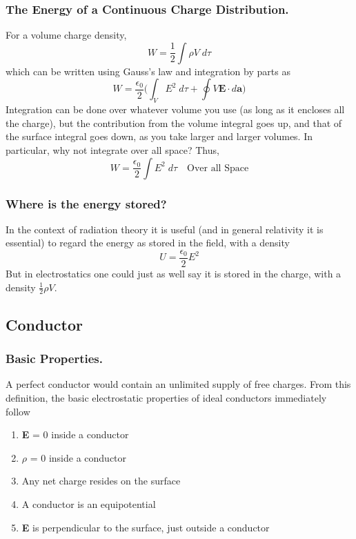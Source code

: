 \documentclass[../../../main.tex]{subfiles}
\begin{document}
\subsubsection*{The Energy of a Continuous Charge Distribution.} For a volume charge density,
\begin{equation*}
    W=\frac{1}{2}\int\rho V\;d\tau
\end{equation*}
which can be written using Gauss's law and integration by parts as
\begin{equation*}
    W=\frac{\epsilon_0}{2}\Biggl(\int_{V}E^2\;d\tau+ \oint V\mathbf{E}\cdot d\mathbf{a}\Biggr)
\end{equation*}
Integration can be done over whatever volume you use (as long as it encloses all the charge), but the contribution from the volume integral goes up, and that of the surface integral goes down, as you take larger and larger volumes. In particular, why not integrate over all space? Thus,
\begin{equation*}
    W=\frac{\epsilon_0}{2}\int E^2\;d\tau\quad\text{Over all Space}
\end{equation*}

\subsubsection*{Where is the energy stored?} In the context of radiation theory it is useful (and in general relativity it is essential) to regard the energy as stored in the field, with a density
\begin{equation*}
    U=\frac{\epsilon_0 }{2}E^2
\end{equation*}
But in electrostatics one could just as well say it is stored in the charge, with a density $\frac{1}{2}\rho V$.

\subsection*{Conductor}
\subsubsection*{Basic Properties.}
A perfect conductor would contain an unlimited supply of free charges. From this definition, the basic electrostatic properties of ideal conductors immediately follow
\begin{enumerate}
    \item \textbf{E} = 0 inside a conductor
    \item $\rho$ = 0 inside a conductor
    \item Any net charge resides on the surface
    \item A conductor is an equipotential
    \item \textbf{E} is perpendicular to the surface, just outside a conductor
\end{enumerate}
\end{document}
